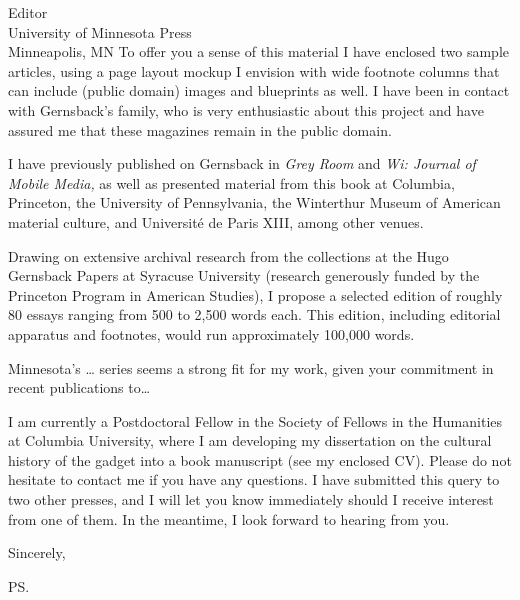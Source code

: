 \documentclass[a4paper,12pt]{letter}
\begin{document}
\begin{letter}{Editor \\ University of Minnesota Press \\ Minneapolis, MN}
To offer you a sense of this material I have enclosed two sample
articles, using a page layout mockup I envision with wide footnote
columns that can include (public domain) images and blueprints as well.
I have been in contact with Gernsback's family, who is very enthusiastic
about this project and have assured me that these magazines remain in
the public domain.

I have previously published on Gernsback in \emph{Grey Room} and
\emph{Wi: Journal of Mobile Media,} as well as presented material from
this book at Columbia, Princeton, the University of Pennsylvania, the
Winterthur Museum of American material culture, and Université de Paris
XIII, among other venues.

Drawing on extensive archival research from the collections at the Hugo
Gernsback Papers at Syracuse University (research generously funded by
the Princeton Program in American Studies), I propose a selected edition
of roughly 80 essays ranging from 500 to 2,500 words each. This edition,
including editorial apparatus and footnotes, would run approximately
100,000 words.

Minnesota's \ldots{} series seems a strong fit for my work, given your
commitment in recent publications to\ldots{}

I am currently a Postdoctoral Fellow in the Society of Fellows in the
Humanities at Columbia University, where I am developing my dissertation
on the cultural history of the gadget into a book manuscript (see my
enclosed CV). Please do not hesitate to contact me if you have any
questions. I have submitted this query to two other presses, and I will
let you know immediately should I receive interest from one of them. In
the meantime, I look forward to hearing from you.

\closing{Sincerely,} %

\cc{} %
\ps{} %

\end{letter}
\end{document}

